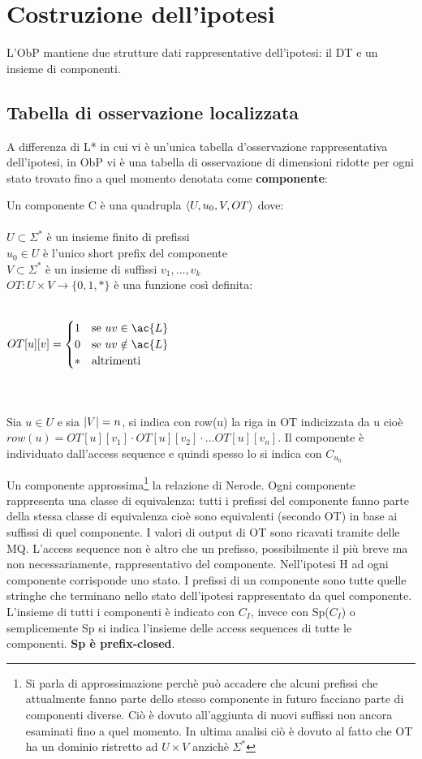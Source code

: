 \section{Costruzione dell'ipotesi}
L'\ac{ObP} mantiene due strutture dati rappresentative dell'ipotesi: il \ac{DT} e un insieme di componenti.
\subsection{Tabella di osservazione localizzata}
A differenza di L* in cui vi è un'unica tabella d'osservazione rappresentativa dell'ipotesi, in \ac{ObP} vi è una tabella di osservazione di dimensioni ridotte per ogni stato trovato fino a quel momento denotata come \textbf{componente}:
\begin{definizione*}[Componente] Un componente C è una quadrupla $\Braket{U,u_0,V,OT}$ dove:\\\\
$U \subset \Sigma^{*}$ è un insieme finito di prefissi\\
$u_0 \in U$ è l'unico short prefix del componente\\
$V \subset \Sigma^{*}$ è un insieme di suffissi  $v_1,\dots,v_k$\\
$OT : U \times V \to \{0,1,*\}$ è una funzione così definita:\\\\
\centerline{$
OT[u][v] = 
\begin{cases}
1
& \text{se $uv \in \ac{L}$} \\
0 & \text{se $uv \notin \ac{L}$}\\
* & \text{altrimenti}
\end{cases}
$}   \\\\
Sia $u \in U$ e sia $\lvert V\rvert = n$, si indica con row(u) la riga in OT indicizzata da u cioè $row(u)=OT[u][v_1] \cdot OT[u][v_2] \cdot \dots OT[u][v_n]$. Il componente è individuato dall'access sequence e quindi spesso lo si indica con $C_{u_{0}}$   
\end{definizione*}
Un componente approssima\footnote{Si parla di approssimazione perchè può accadere che alcuni prefissi che attualmente fanno parte dello stesso componente in futuro facciano parte di componenti diverse. Ciò è dovuto all'aggiunta di nuovi suffissi non ancora esaminati fino a quel momento. In ultima analisi ciò è dovuto al fatto che OT ha un dominio ristretto ad $U\times{}V$ anzichè $\Sigma^{*}$} la relazione di Nerode. Ogni componente rappresenta una classe di equivalenza: tutti i prefissi del componente fanno parte della stessa classe di equivalenza cioè   sono equivalenti (secondo OT) in base ai suffissi di quel componente. I valori di output di OT sono ricavati tramite delle \ac{MQ}. L'access sequence non è altro che un prefisso, possibilmente il più breve ma non necessariamente, rappresentativo del componente. Nell'ipotesi \ac{H} ad ogni componente  corrisponde uno stato. I prefissi di un componente sono tutte quelle stringhe che terminano nello stato dell'ipotesi rappresentato da quel componente. L'insieme di tutti i componenti è indicato con $C_I$, invece con Sp($C_I$) o semplicemente Sp si indica l'insieme delle access sequences di tutte le componenti. \textbf{Sp è prefix-closed}.
